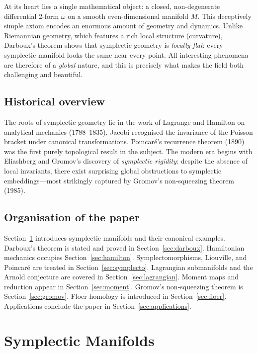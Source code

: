 \documentclass[12pt,a4paper]{amsart}
\theoremstyle{definition}
\begin{document}
At its heart lies a single mathematical object: a closed, non-degenerate
differential 2-form $\omega$ on a smooth even-dimensional manifold $M$.
This deceptively simple axiom encodes an enormous amount of geometry and
dynamics.  Unlike Riemannian geometry, which features a rich local structure
(curvature), Darboux's theorem shows that symplectic geometry is \emph{locally
flat}: every symplectic manifold looks the same near every point.  All
interesting phenomena are therefore of a \emph{global} nature, and this is
precisely what makes the field both challenging and beautiful.

\subsection*{Historical overview}

The roots of symplectic geometry lie in the work of Lagrange and Hamilton on
analytical mechanics (1788--1835).  Jacobi recognised the invariance of the
Poisson bracket under canonical transformations.  Poincar\'{e}'s recurrence
theorem (1890) was the first purely topological result in the subject.  The
modern era begins with Eliashberg and Gromov's discovery of \emph{symplectic
rigidity}: despite the absence of local invariants, there exist surprising
global obstructions to symplectic embeddings---most strikingly captured by
Gromov's non-squeezing theorem (1985).

\subsection*{Organisation of the paper}

Section~\ref{sec:manifolds} introduces symplectic manifolds and their
canonical examples.  Darboux's theorem is stated and proved in
Section~\ref{sec:darboux}.  Hamiltonian mechanics occupies
Section~\ref{sec:hamilton}.  Symplectomorphisms, Liouville, and Poincar\'{e}
are treated in Section~\ref{sec:symplecto}.  Lagrangian submanifolds and the
Arnold conjecture are covered in Section~\ref{sec:lagrangian}.  Moment maps
and reduction appear in Section~\ref{sec:moment}.  Gromov's non-squeezing
theorem is Section~\ref{sec:gromov}.  Floer homology is introduced in
Section~\ref{sec:floer}.  Applications conclude the paper in
Section~\ref{sec:applications}.

\section{Symplectic Manifolds}
\label{sec:manifolds}
\end{document}
